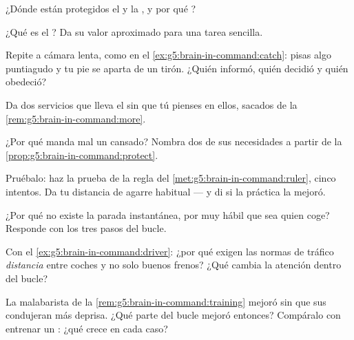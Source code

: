 \begin{exercise}[$\star$]\label{exo:g5:brain-in-command:3}
¿Dónde están protegidos el  y la , y por qué
?
\end{exercise}

\begin{exercise}[$\star$]\label{exo:g5:brain-in-command:4}
¿Qué es el ? Da su valor aproximado para una tarea
sencilla.
\end{exercise}

\begin{exercise}[$\star$]\label{exo:g5:brain-in-command:5}
Repite a cámara lenta, como en el \cref{ex:g5:brain-in-command:catch}:
pisas algo puntiagudo y tu pie se aparta de un tirón. ¿Quién informó,
quién decidió y quién obedeció?
\end{exercise}

\begin{exercise}[$\star$]\label{exo:g5:brain-in-command:6}
Da dos servicios que lleva el  sin que tú pienses en ellos,
sacados de la \cref{rem:g5:brain-in-command:more}.
\end{exercise}

\begin{exercise}[$\star$]\label{exo:g5:brain-in-command:7}
¿Por qué manda mal un  cansado? Nombra dos de sus necesidades a
partir de la \cref{prop:g5:brain-in-command:protect}.
\end{exercise}

\begin{exercise}[$\star$]\label{exo:g5:brain-in-command:8}
Pruébalo: haz la prueba de la regla del
\cref{met:g5:brain-in-command:ruler}, cinco intentos. Da tu distancia
de agarre habitual --- y di si la práctica la mejoró.
\end{exercise}

\begin{exercise}[$\star\star$]\label{exo:g5:brain-in-command:9}
¿Por qué no existe la parada instantánea, por muy hábil que sea quien
coge? Responde con los tres pasos del bucle.
\end{exercise}

\begin{exercise}[$\star\star$]\label{exo:g5:brain-in-command:10}
Con el \cref{ex:g5:brain-in-command:driver}: ¿por qué exigen las
normas de tráfico \emph{distancia} entre coches y no solo buenos
frenos? ¿Qué cambia la atención dentro del bucle?
\end{exercise}

\begin{exercise}[$\star\star\star$]\label{exo:g5:brain-in-command:11}
La malabarista de la \cref{rem:g5:brain-in-command:training} mejoró sin
que sus  condujeran más deprisa. ¿Qué parte del bucle mejoró
entonces? Compáralo con entrenar un : ¿qué crece en cada caso?
\end{exercise}
